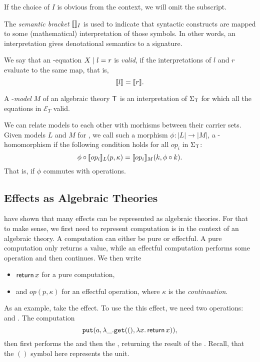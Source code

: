 If the choice of $I$ is obvious from the context, we will omit the subscript.

The \emph{semantic bracket} $\llbracket\rrbracket_I$ is used to indicate that syntactic constructs are mapped to some (mathematical) interpretation of those symbols. In other words, an interpretation gives denotational semantics to a signature.

\begin{definition}[Model]
    We say that an \Sig-equation $X \;|\; l = r$ is \emph{valid}, if the interpretations of $l$ and $r$ evaluate to the same map, that is,
    \[ \llbracket l\rrbracket = \llbracket r\rrbracket. \]

    A \T-\emph{model} $M$ of an algebraic theory $\mathsf{T}$ is an interpretation of $\Sigma_\mathsf{T}$ for which all the equations in $\mathcal{E}_T$ valid.
\end{definition}

We can relate models to each other with morhisms between their carrier sets. Given models $L$ and $M$ for \T, we call such a morphism $\phi : |L| \to |M|$, a \T-homomorphism if the following condition holds for all $op_i$ in $\Sigma_\mathsf{T}$:
\[ \phi \circ \llbracket op_i\rrbracket_L(p, \kappa) = \llbracket op_i\rrbracket_M(k, \phi \circ k). \]
That is, if $\phi$ commutes with operations.



\subsection{Effects as Algebraic Theories}

\textcite{goos_adequacy_2001} have shown that many effects can be represented as algebraic theories. For that to make sense, we first need to represent computation is in the context of an algebraic theory. A computation can either be pure or effectful. A pure computation only returns a value, while an effectful computation performs some operation and then continues. We then write
\begin{itemize}
    \item $\operatorname{\mathsf{return}} x$ for a pure computation,
    \item and $op(p, \kappa)$ for an effectful operation, where $\kappa$ is the \emph{continuation}.
\end{itemize}

As an example, take the  effect. To use the this effect, we need two operations:  and . The computation
\[ \mathtt{put}(a, \lambda \_. \mathtt{get}((), \lambda x. \operatorname{\mathsf{return}} x)), \]
then first performs the \oput and then the \oget, returning the result of the \oget. Recall, that the $()$ symbol here represents the unit.


